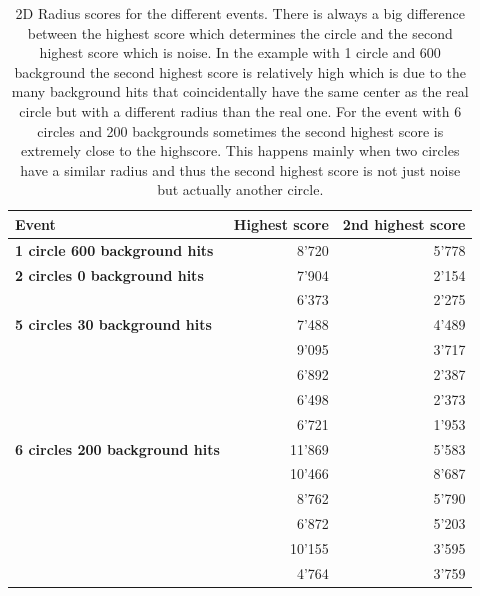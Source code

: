 \documentclass[11pt]{scrreprt}
\begin{document}
\begin{table}[tbp]
  \caption[2D Radius scores for the different events]{2D Radius scores for the different events. There is always a big difference between the highest score
  which determines the circle and the second highest score which is noise. In the example with 1 circle and 600
  background the second highest score is relatively high which is due to the many background hits that coincidentally
  have the same center as the real circle but with a different radius than the real one. For the event with 6 circles 
  and 200 backgrounds sometimes the second highest score is extremely close to the highscore.
  This happens mainly when two circles have a similar radius and thus the second highest score is not just noise but actually
  another circle.}
  \label{tab:2d_scores}
  \centering

  \begin{tabular}{lrr}
  \toprule
  \textbf{Event} & \textbf{Highest score} & \textbf{2nd highest score} \\
  \midrule
  \midrule
  \textbf{1 circle 600 background hits} & 8'720 & 5'778\\
  \midrule
  \textbf{2 circles 0 background hits} & 7'904 & 2'154\\
   & 6'373 & 2'275\\
  \midrule
  \textbf{5 circles 30 background hits} & 7'488 & 4'489\\
  & 9'095 & 3'717\\
  & 6'892 & 2'387\\
  & 6'498 & 2'373\\
  & 6'721 & 1'953\\
  \midrule
  \textbf{6 circles 200 background hits} & 11'869 & 5'583\\
  & 10'466 & 8'687\\
  & 8'762 & 5'790\\
  & 6'872 & 5'203\\
  & 10'155  & 3'595\\
  & 4'764 &  3'759\\
  \bottomrule
  \end{tabular}
\end{table}
\end{document}
